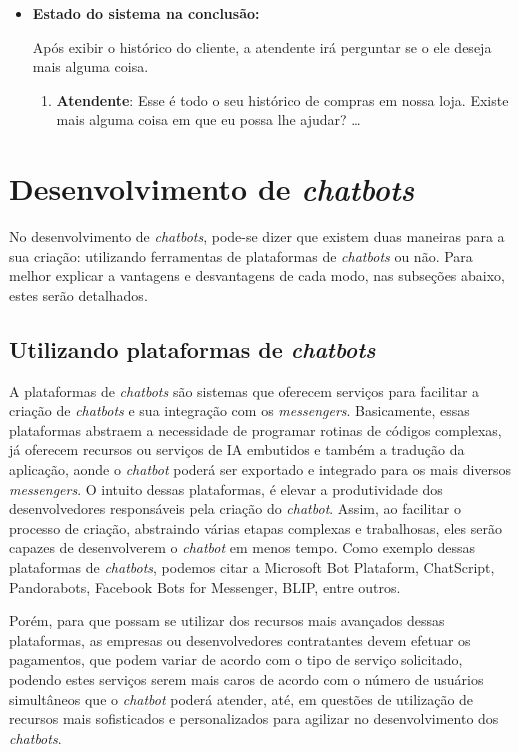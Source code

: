 \begin{itemize}
    \item \textbf{Estado do sistema na conclusão:}
    
    Após exibir o histórico do cliente, a atendente irá perguntar se o ele deseja mais alguma coisa.
    
    \begin{enumerate}
        \item \textbf{Atendente}: Esse é todo o seu histórico de compras em nossa loja. Existe mais alguma coisa em que eu possa lhe ajudar?
        \ldots
    \end{enumerate}
    
    
\end{itemize}


\section{Desenvolvimento de \textit{chatbots}}\label{chatbot:dev}

No desenvolvimento de \textit{chatbots}, pode-se dizer que existem duas maneiras para a sua criação: utilizando ferramentas de plataformas de \textit{chatbots} ou não. Para melhor explicar a vantagens e desvantagens de cada modo, nas subseções abaixo, estes serão detalhados.

\subsection{Utilizando plataformas de \textit{chatbots}}\label{chatbot:dev:plat}

A plataformas de \textit{chatbots} são sistemas que oferecem serviços para facilitar a criação de \textit{chatbots} e sua integração com os  \textit{messengers}.
Basicamente, essas plataformas abstraem a necessidade de programar rotinas de códigos complexas, já oferecem recursos ou serviços de IA embutidos e também a tradução da aplicação, aonde o \textit{chatbot} poderá ser exportado e integrado para os mais diversos \textit{messengers}.
O intuito dessas plataformas, é elevar a produtividade dos desenvolvedores responsáveis pela criação do \textit{chatbot}.
Assim, ao facilitar o processo de criação, abstraindo várias etapas complexas e trabalhosas, eles serão capazes de desenvolverem o \textit{chatbot} em menos tempo.
Como exemplo dessas plataformas de \textit{chatbots}, podemos citar a Microsoft Bot Plataform, ChatScript, Pandorabots, Facebook Bots for Messenger, BLIP, entre outros.

Porém, para que possam se utilizar dos recursos mais avançados dessas plataformas, as empresas ou desenvolvedores contratantes devem efetuar os pagamentos, que podem variar de acordo com o tipo de serviço solicitado, podendo estes serviços serem mais caros de acordo com o número de usuários simultâneos que o \textit{chatbot} poderá atender, até, em questões de utilização de recursos mais sofisticados e personalizados para agilizar no desenvolvimento dos \textit{chatbots}. 


